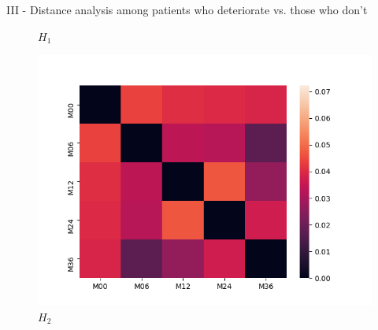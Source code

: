 \documentclass[aspectratio=169, 10pt, dvipsnames]{beamer}
\begin{document}
\begin{frame}[fragile]{III - Distance analysis among patients who deteriorate vs. those who don't}
\begin{figure}
    \caption{$H_1$}
  \end{figure}%
  \endminipage
  \hfill
  \begin{figure}
    \centering
     \includegraphics[width=\textwidth]{figures/temporal_evolution/ADNI011S0023_h_2.png}
    \caption{$H_2$}
  \end{figure}
  \endminipage
\end{frame}
\end{document}
